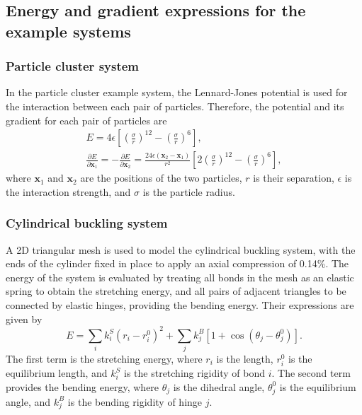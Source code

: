 \documentclass[twocolumn,10pt]{revtex4}
\begin{document}
\subsection{Energy and gradient expressions for the example systems}
\subsubsection{Particle cluster system}
In the particle cluster example system, the Lennard-Jones potential is used for the interaction between each pair of particles.
Therefore, the potential and its gradient for each pair of particles are
\begin{gather}
  E = 4\epsilon \left[ \left(\frac{\sigma}{r}\right)^{12} - \left(\frac{\sigma}{r}\right)^6 \right], \\
  \frac{\partial E}{\partial \bm{x}_1} = -\frac{\partial E}{\partial \bm{x}_2} =
    \frac{24 \epsilon (\bm{x}_2 - \bm{x}_1)}{r^2} \left[ 2 \left(\frac{\sigma}{r}\right)^{12} - \left(\frac{\sigma}{r}\right)^6 \right],
\end{gather}
where $\bm{x}_1$ and $\bm{x}_2$ are the positions of the two particles, $r$ is their separation, $\epsilon$ is the interaction strength, and $\sigma$ is the particle radius.

\subsubsection{Cylindrical buckling system}
A 2D triangular mesh is used to model the cylindrical buckling system, with the ends of the cylinder fixed in place to apply an axial compression of 0.14\%.
The energy of the system is evaluated by treating all bonds in the mesh as an elastic spring to obtain the stretching energy, and all pairs of adjacent triangles to be connected by elastic hinges, providing the bending energy.
Their expressions are given by
\begin{equation}
  E = \sum_i k^S_i (r_i - r^0_i)^2 + \sum_j k^B_j [1 + \cos(\theta_j - \theta^0_j)].
\end{equation}
The first term is the stretching energy, where $r_i$ is the length, $r^0_i$ is the equilibrium length, and $k^S_i$ is the stretching rigidity of bond $i$.
The second term provides the bending energy, where $\theta_j$ is the dihedral angle, $\theta^0_j$ is the equilibrium angle, and $k^B_j$ is the bending rigidity of hinge $j$.
\end{document}
